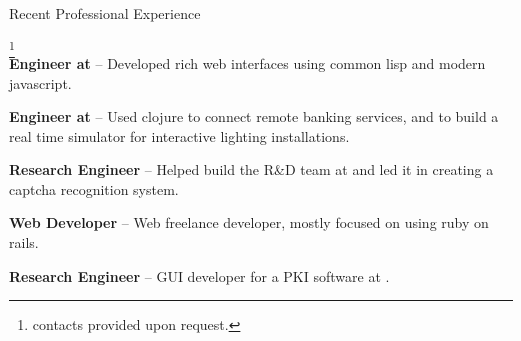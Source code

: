 \begin{rubric}{Recent Professional Experience}{ \footnote{contacts
provided upon request.}  \\

    \entry*[2013-06 - 2015-02] \textbf{Engineer at
} --
Developed rich web interfaces using common lisp and modern javascript.

    \entry*[2012 - 2013-06] \textbf{Engineer at
} --
Used clojure to connect remote banking services, and to build a real
time simulator for interactive lighting installations.

    \entry*[2010 - 2012] \textbf{Research Engineer} -- Helped build
the R\&D team at 
and led it in creating a captcha recognition system.

    \entry*[2007-2009] \textbf{Web Developer} -- Web freelance
developer, mostly focused on using ruby on rails.

    \entry*[2005 - 2007] \textbf{Research Engineer} -- GUI developer
for a PKI software at .

}
\end{rubric}

